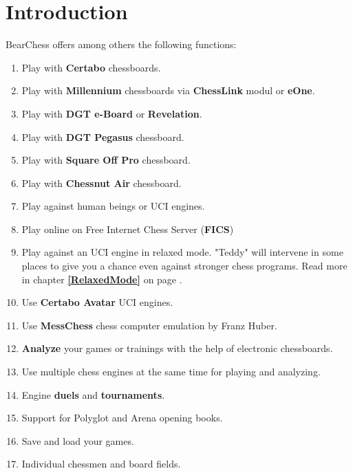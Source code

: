 \documentclass[11pt,a4paper]{article}
\begin{document}
\section{Introduction}
BearChess offers among others the following functions:
\begin{enumerate}
	  \item Play with \textbf{Certabo} chessboards.
	  \item Play with \textbf{Millennium} chessboards via \textbf{ChessLink} modul or \textbf{eOne}.
 	  \item Play with \textbf{DGT e-Board} or \textbf{Revelation}.	  
	  \item Play with \textbf{DGT Pegasus} chessboard.	  
	  \item Play with \textbf{Square Off Pro} chessboard.	  	  
	  \item Play with \textbf{Chessnut Air} chessboard.	  	  	  
  	  \item Play against human beings or UCI engines.
  	  \item Play online on Free Internet Chess Server (\textbf{FICS})
  	  \item Play against an UCI engine in relaxed mode. "Teddy" will intervene in some places to give you a chance even against stronger chess programs. Read more in chapter \textbf{\ref{RelaxedMode}  } on page \pageref{RelaxedMode}.  	  
  	  \item Use \textbf{Certabo Avatar} UCI engines.  	  
  	  \item Use \textbf{MessChess} chess computer emulation by Franz Huber.  	    	  
  	  \item \textbf{Analyze} your games or trainings with the help of electronic chessboards.
  	  \item Use multiple chess engines at the same time for playing and analyzing.
  	  \item Engine \textbf{duels} and \textbf{tournaments}.
  	  \item Support for Polyglot and Arena opening books.
  	  \item Save and load your games.
  	  \item Individual chessmen and board fields.
\end{enumerate}
\end{document}
